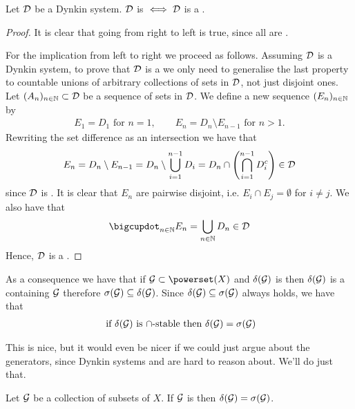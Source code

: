 \begin{lem}
	Let $\mathcal{D}$ be a Dynkin system. $\mathcal{D}$ is \istable $\iff \mathcal{D}$ is a \siga.
\end{lem}

\begin{proof}
	It is clear that going from right to left is true, since all \sigas are \istable.
	
	For the implication from left to right we proceed as follows. Assuming $\mathcal{D}$ is a \istable Dynkin system, to prove that $\mathcal{D}$ is a \siga we only need to generalise the last property to countable unions of arbitrary collections of sets in $\mathcal{D}$, not just disjoint ones. Let $(A_n)_{n\in\mathbb{N}} \subset \mathcal{D}$ be a sequence of sets in $\mathcal{D}$. We define a new sequence $(E_n)_{n\in\mathbb{N}}$ by
	\begin{align*}
	E_1 = D_1 \text{ for } n = 1,\qquad E_n = D_n \setminus E_{n-1} \text{ for } n > 1.
	\end{align*}
	Rewriting the set difference as an intersection we have that
	\begin{align*}
	E_n = D_n \setminus E_{n-1} = D_n \setminus \bigcup_{i=1}^{n-1}D_i = D_n \cap \left(\bigcap_{i=1}^{n-1} D_i^c\right) \in \mathcal{D}
	\end{align*}
	since $\mathcal{D}$ is \istable.
	It is clear that $E_n$ are pairwise disjoint, i.e. $E_i \cap E_j = \emptyset$ for $i \neq j$. We also have that
	\begin{align*}
	\bigcupdot_{n \in \N} E_n = \bigcup_{n \in \N} D_n \in \calD
	\end{align*}
	Hence, $\mathcal{D}$ is a \siga.
\end{proof}

\begin{remark}
	As a consequence we have that if $\calG \subset \powerset(X)$ and $\delta(\mathcal{G})$ is \istable then $\delta(\mathcal{G})$ is a \siga containing $\mathcal{G}$ therefore $\sigma(\mathcal{G}) \subseteq \delta(\mathcal{G})$. Since $\delta(\mathcal{G}) \subseteq \sigma(\mathcal{G})$ always holds, we have that
	\begin{align*}
	\text{ if } \delta(\mathcal{G}) \text{ is $\cap$-stable then } \delta(\mathcal{G}) = \sigma(\mathcal{G})
	\end{align*}
\end{remark}

This is nice, but it would even be nicer if we could just argue about the generators, since Dynkin systems and \sigas are hard to reason about. We'll do just that.

\begin{lem}
	Let $\mathcal{G}$ be a collection of subsets of $X$. If $\mathcal{G}$ is \istable then $\delta(\mathcal{G}) = \sigma(\mathcal{G})$.
\end{lem}

